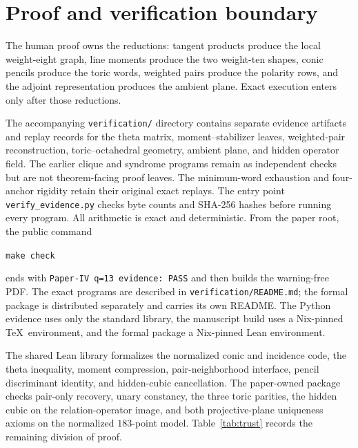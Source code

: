 \documentclass[11pt]{article}
\theoremstyle{definition}
\theoremstyle{remark}
\begin{document}
\section{Proof and verification boundary}

The human proof owns the reductions: tangent products produce the local
weight-eight graph, line moments produce the two weight-ten shapes, conic
pencils produce the toric words, weighted pairs produce the polarity rows,
and the adjoint representation produces the ambient plane.  Exact execution
enters only after those reductions.

The accompanying \nolinkurl{verification/} directory contains separate
evidence artifacts and replay records for the theta matrix,
moment--stabilizer leaves,
weighted-pair reconstruction, toric--octahedral geometry, ambient plane, and
hidden operator field.  The earlier clique and syndrome programs remain as
independent checks but are not theorem-facing proof leaves.  The minimum-word
exhaustion and four-anchor rigidity retain their original exact replays.
The entry point \nolinkurl{verify_evidence.py} checks byte counts and SHA-256
hashes before running every program.  All arithmetic is exact and
deterministic.
From the paper root, the public command
\begin{center}
\small\texttt{make check}
\end{center}
ends with \texttt{Paper-IV q=13 evidence: PASS} and then builds the
warning-free PDF.  The exact programs are described in
\nolinkurl{verification/README.md}; the formal package is distributed
separately and carries its own README.  The Python evidence uses only the
standard library, the manuscript build uses a Nix-pinned \TeX\ environment,
and the formal package a Nix-pinned Lean environment.

The shared Lean library formalizes the normalized conic and incidence code,
the theta inequality, moment compression, pair-neighborhood interface,
pencil discriminant identity, and hidden-cubic cancellation.  The
paper-owned package checks pair-only recovery, unary constancy, the three
toric parities, the hidden cubic on the relation-operator image, and both
projective-plane uniqueness axioms on the normalized \(183\)-point model.
Table~\ref{tab:trust} records the remaining division of proof.
\end{document}
